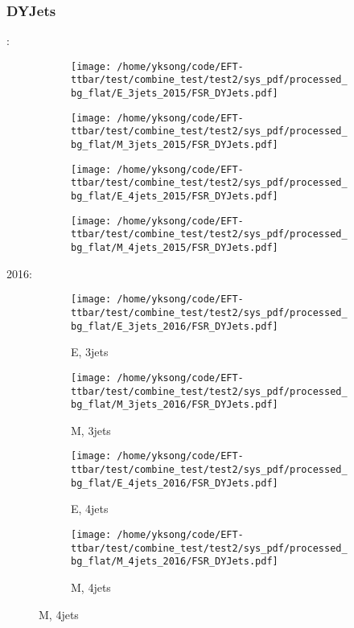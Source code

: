 \documentclass{beamer}
\begin{document}
\begin{frame}
\frametitle{DYJets}
\fontsize{5}{1}:
\begin{figure}
\centering
\begin{subfigure}[b]{0.24\textwidth}
\texttt{[image: /home/yksong/code/EFT-ttbar/test/combine\_test/test2/sys\_pdf/processed\_bg\_flat/E\_3jets\_2015/FSR\_DYJets.pdf]}
\end{subfigure}
\begin{subfigure}[b]{0.24\textwidth}
\texttt{[image: /home/yksong/code/EFT-ttbar/test/combine\_test/test2/sys\_pdf/processed\_bg\_flat/M\_3jets\_2015/FSR\_DYJets.pdf]}
\end{subfigure}
\begin{subfigure}[b]{0.24\textwidth}
\texttt{[image: /home/yksong/code/EFT-ttbar/test/combine\_test/test2/sys\_pdf/processed\_bg\_flat/E\_4jets\_2015/FSR\_DYJets.pdf]}
\end{subfigure}
\begin{subfigure}[b]{0.24\textwidth}
\texttt{[image: /home/yksong/code/EFT-ttbar/test/combine\_test/test2/sys\_pdf/processed\_bg\_flat/M\_4jets\_2015/FSR\_DYJets.pdf]}
\end{subfigure}
\end{figure}
2016:
\begin{figure}
\centering
\begin{subfigure}[b]{0.24\textwidth}
\texttt{[image: /home/yksong/code/EFT-ttbar/test/combine\_test/test2/sys\_pdf/processed\_bg\_flat/E\_3jets\_2016/FSR\_DYJets.pdf]}
\captionsetup{font=tiny}
\caption{E, 3jets}
\end{subfigure}
\begin{subfigure}[b]{0.24\textwidth}
\texttt{[image: /home/yksong/code/EFT-ttbar/test/combine\_test/test2/sys\_pdf/processed\_bg\_flat/M\_3jets\_2016/FSR\_DYJets.pdf]}
\captionsetup{font=tiny}
\caption{M, 3jets}
\end{subfigure}
\begin{subfigure}[b]{0.24\textwidth}
\texttt{[image: /home/yksong/code/EFT-ttbar/test/combine\_test/test2/sys\_pdf/processed\_bg\_flat/E\_4jets\_2016/FSR\_DYJets.pdf]}
\captionsetup{font=tiny}
\caption{E, 4jets}
\end{subfigure}
\begin{subfigure}[b]{0.24\textwidth}
\texttt{[image: /home/yksong/code/EFT-ttbar/test/combine\_test/test2/sys\_pdf/processed\_bg\_flat/M\_4jets\_2016/FSR\_DYJets.pdf]}
\captionsetup{font=tiny}
\caption{M, 4jets}
\end{subfigure}
\end{figure}
\end{frame}
\end{document}
